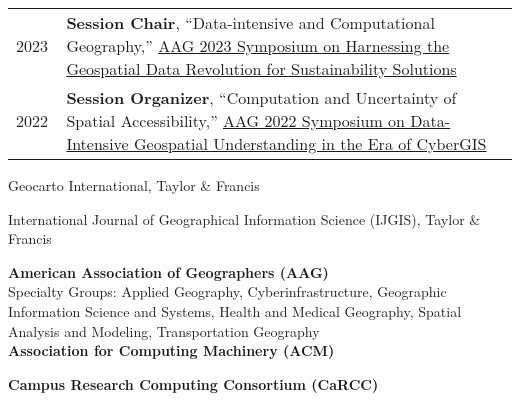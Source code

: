 \documentclass{acmcv}
\begin{document}
\begin{longtable}{p{0.1\linewidth} p{0.9\linewidth}}
        2023 & \textbf{Session Chair}, ``Data-intensive and Computational Geography,'' \href{https://iguide.illinois.edu/aag-2023-symposium-on-harnessing-the-geospatial-data-revolution-for-sustainability-solutions/}{AAG 2023 Symposium on Harnessing the Geospatial Data Revolution for Sustainability Solutions}\\

        2022 & \textbf{Session Organizer}, ``Computation and Uncertainty of Spatial Accessibility,'' \href{https://cybergis.illinois.edu/aag-symposium-2022/}{AAG 2022 Symposium on Data-Intensive Geospatial Understanding in the Era of CyberGIS}\\
    \end{longtable}

    \vspace*{0.25cm}
    \begin{titemize}
        \item Geocarto International, Taylor \& Francis
        \item International Journal of Geographical Information Science (IJGIS), Taylor \& Francis
    \end{titemize}



    \vspace*{0.5cm}
\vspace*{.3cm}

    \textbf{American Association of Geographers (AAG)} \\
    Specialty Groups: Applied Geography, Cyberinfrastructure, Geographic Information Science and Systems, Health and Medical Geography, Spatial Analysis and Modeling, Transportation Geography \\

    \textbf{Association for Computing Machinery (ACM)}

    \textbf{Campus Research Computing Consortium (CaRCC)}
\end{document}
